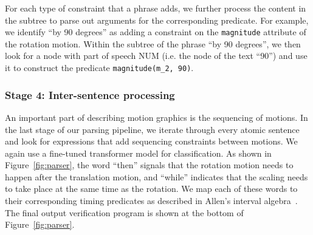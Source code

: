 %
%

For each type of constraint that a phrase adds, we further process the content in the subtree to parse out arguments for the corresponding predicate.
For example, we identify ``by 90 degrees'' as adding a constraint on the \texttt{magnitude} attribute of the rotation motion.
Within the subtree of the phrase ``by 90 degrees'', we then look for a node with part of speech NUM (i.e. the node of the text ``90'') and use it to construct the predicate \texttt{magnitude(m\_2, 90)}.


\subsubsection{Stage 4: Inter-sentence processing}
An important part of describing motion graphics is the sequencing of
motions.  In the last stage of our parsing pipeline, we iterate
through every atomic sentence and look for expressions that add
sequencing constraints between motions.  We again use a fine-tuned
transformer model for classification.
As shown in
Figure~\ref{fig:parser}, the word ``then'' signals that the rotation
motion needs to happen after the translation motion, and ``while''
indicates that the scaling needs to take place at the same time as the
rotation.  We map each of these words to their corresponding timing
predicates as described in Allen's interval
algebra~\cite{allen1983interval}.
The final output verification
program is shown at the bottom of Figure~\ref{fig:parser}.

